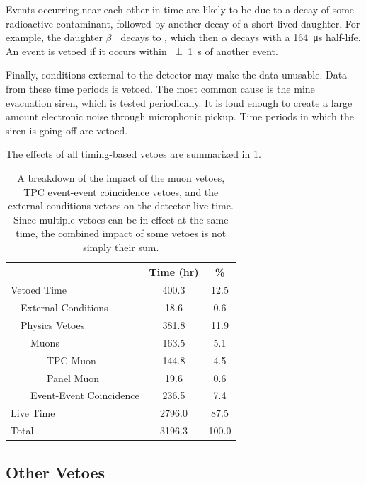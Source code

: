 \documentclass[herrin-thesis.tex]{subfiles}
\begin{document}
Events occurring near each other in time are likely to be due to a decay of some radioactive contaminant, followed by another decay of a short-lived daughter. For example, the  daughter  \(\beta^{-}\) decays to , which then \(\alpha\) decays with a \SI{164}{\micro\s} half-life.  An event is vetoed if it occurs within \SI{\pm1}{\s} of another event.

Finally, conditions external to the detector may make the data unusable. Data from these time periods is vetoed. The most common cause is the mine evacuation siren, which is tested periodically. It is loud enough to create a large amount electronic noise through microphonic pickup. Time periods in which the siren is going off are vetoed.

The effects of all timing-based vetoes are summarized in \cref{tab:analysis_veto_effects}.

\begin{table}[htp]
\centering
\caption[Impact of timing-based vetoes]{A breakdown of the impact of the muon vetoes, TPC event-event coincidence vetoes, and the external conditions vetoes on the detector live time. Since multiple vetoes can be in effect at the same time, the combined impact of some vetoes is not simply their sum.}
\label{tab:analysis_veto_effects}
\begin{tabular}{l l l l c c}\toprule
\multicolumn{4}{c}{}							&	Time (\si{hr})	&	\%	\\\midrule
\multicolumn{4}{l}{Vetoed Time}				&	400.3		&	12.5	\\
	&\multicolumn{3}{l}{External Conditions}		&	18.6			&	0.6	\\
	&\multicolumn{3}{l}{Physics Vetoes}			&	381.8		&	11.9	\\
	&&\multicolumn{2}{l}{Muons}				&	163.5		&	5.1	\\
	&&&TPC Muon							&	144.8		&	4.5	\\
	&&&Panel Muon						&	19.6			&	0.6	\\
	&&\multicolumn{2}{l}{Event-Event Coincidence}&	236.5		&	7.4	\\
\multicolumn{4}{l}{Live Time}					&	2796.0		&	87.5	\\\midrule
\multicolumn{4}{l}{Total}						&	3196.3		&	100.0\\\bottomrule
\end{tabular}
\end{table}

\subsection{Other Vetoes}
\end{document}

